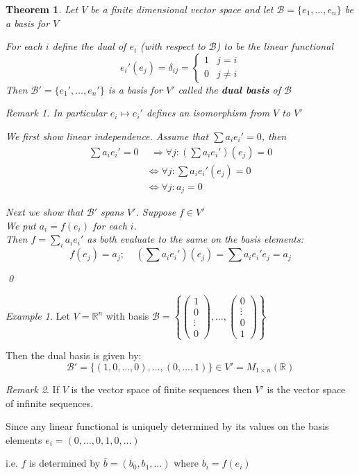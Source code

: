 \documentclass[11pt, a4paper]{report}
\makeatletter
\numberwithin{equation}{section}
\newcommand{\R}{\mathbb{R}}
\newcommand{\B}{\mathcal{B}}
\newcommand{\smp}[1]{\left(\begin{smallmatrix}#1\end{smallmatrix}\right)}
\numberwithin{equation}{subsection}
\theoremstyle{plain}
\newtheorem{thm}{Theorem}[chapter] %
\theoremstyle{definition}
\theoremstyle{remark}
\newtheorem*{rem}{Remark}
\newtheorem{exmp}{Example}[chapter]
\newtheorem*{prf}{Proof}
\renewenvironment{prf}[1][\proofname]{\par
  \vspace{-\topsep}%
  \normalfont
  \topsep0pt \partopsep0pt %
  \trivlist
  \item[\hskip\labelsep
        \itshape
    #1\@addpunct{.}]\ignorespaces
}{%
  \popQED\endtrivlist\@endpefalse
  \addvspace{6pt plus 6pt} %
}
\newcommand{\pr}[1]{\begin{adjustwidth}{1cm}{} \begin{prf} #1 \end{prf} \end{adjustwidth}}
\makeatother
\begin{document}
\begin{thm}
Let $V$ be a finite dimensional vector space and let $\B = \{ e_1, \ldots, e_n \}$ be a basis for $V$

For each $i$ define the dual of $e_i$ (with respect to $\B$) to be the linear functional
$$e_i'(e_j) = \delta_{ij} = \begin{cases} 1 & j=i \\ 0 & j \neq i \end{cases} $$
Then $\B' = \{ e_1', \ldots, e_n' \}$ is a basis for $V'$ called the \textbf{dual basis} of $\B$

\begin{rem} In particular $e_i \mapsto e_i'$ defines an isomorphism from $V$ to $V'$ \end{rem}

\pr{
We first show linear independence. Assume that $\sum a_i e_i' = 0$, then
\begin{align*}
\sum a_i e_i' = 0	
	&\,\;\Longrightarrow \forall j: \left( \sum a_i e_i' \right)(e_j) = 0\\
	&\iff \forall j : \sum a_i e_i' (e_j) = 0\\
	&\iff \forall j : a_j = 0
\end{align*}

Next we show that $\B'$ spans $V'$. Suppose $f \in V'$\\
We put $a_i = f(e_i)$ for each $i$.\\
Then $f = \sum_i a_i e_i'$ as both evaluate to the same on the basis elements:
$$f(e_j) = a_j; \;\;\;\; \left( \sum a_i e_i' \right)(e_j) = \sum a_i e_i' e_j = a_j$$
}\qed
\end{thm}

\begin{exmp}
Let $V = \R^n$ with basis $\B = \left\{ \smp{1\\0\\\vdots\\0}, \ldots, \smp{0\\\vdots\\0\\1} \right\}$

Then the dual basis is given by:
$$\B' = \{(1,0,\ldots,0), \ldots, (0,\ldots,1)\} \in V' = M_{1 \times n}(\R)$$
\end{exmp}

\begin{rem}
If $V$ is the vector space of finite sequences then $V'$ is the vector space of infinite sequences.

Since any linear functional is uniquely determined by its values on the basis elements $e_i = (0, \ldots, 0, 1, 0, \ldots)$

i.e. $f$ is determined by $\bar{b} = (b_0, b_1, \ldots)$ where $b_i = f(e_i)$
\end{rem}
\end{document}
